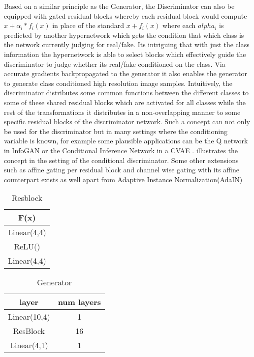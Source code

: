 Based on a similar principle as the Generator, the Discriminator can also be equipped with gated residual blocks whereby each residual block would compute $x+\alpha_i*f_i(x)$ in place of the standard $x+f_i(x)$ where each $alpha_i$ is predicted by another hypernetwork which gets the condition that which class is the network currently judging for real/fake. Its intriguing that with just the class information the hypernetwork is able to select blocks which effectively guide the discriminator to judge whether its real/fake conditioned on the class. Via accurate gradients backpropagated to the generator it also enables the generator to generate class conditioned high resolution image samples. Intuitively, the discriminator distributes some common functions between the different classes to some of these shared residual blocks which are activated for all classes while the rest of the transformations it distributes in a non-overlapping manner to some specific residual blocks of the discriminator network. Such a concept can not only be used for the discriminator but in many settings where the conditioning variable is known, for example some plausible applications can be the Q network in InfoGAN\cite{chen2016infogan} or the Conditional Inference Network in a CVAE \cite{sohn2015learning}.  illustrates the concept in the setting of the conditional discriminator. Some other extensions such as affine gating per residual block and channel wise gating with its affine counterpart exists as well apart from Adaptive Instance Normalization(AdaIN) \cite{huang2017arbitrary}


\begin{table}[ht]
\caption{Resblock} %
\centering %
\begin{tabular}{c} %
\hline\hline %
F(x)\\%
\hline %
Linear(4,4)\\ %
ReLU() \\
Linear(4,4) \\
\hline %
\end{tabular}
\label{table:resblock} %
\end{table}


\begin{table}[ht]
\caption{Generator} %
\centering %
\begin{tabular}{c c} %
\hline\hline %
layer & num layers\\%
\hline %
Linear(10,4) & 1\\ %
ResBlock & 16 \\
Linear(4,1) & 1 \\
\hline %
\end{tabular}
\label{table:1d_G} %
\end{table}

